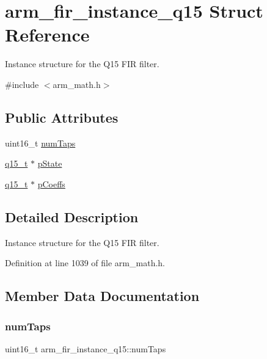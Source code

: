 \hypertarget{structarm__fir__instance__q15}{}\section{arm\+\_\+fir\+\_\+instance\+\_\+q15 Struct Reference}
\label{structarm__fir__instance__q15}


Instance structure for the Q15 F\+IR filter.  




{\ttfamily \#include $<$arm\+\_\+math.\+h$>$}

\subsection*{Public Attributes}
\begin{DoxyCompactItemize}
\item 
uint16\+\_\+t \hyperlink{structarm__fir__instance__q15_a0e46f93cf51bfb18b1be808be9c5bfc9}{num\+Taps}
\item 
\hyperlink{arm__math_8h_ab5a8fb21a5b3b983d5f54f31614052ea}{q15\+\_\+t} $\ast$ \hyperlink{structarm__fir__instance__q15_aa8d25f44f45b6a6c4cf38c31569b8a01}{p\+State}
\item 
\hyperlink{arm__math_8h_ab5a8fb21a5b3b983d5f54f31614052ea}{q15\+\_\+t} $\ast$ \hyperlink{structarm__fir__instance__q15_a6d16db16a5f8f0db54938f2967244d9e}{p\+Coeffs}
\end{DoxyCompactItemize}


\subsection{Detailed Description}
Instance structure for the Q15 F\+IR filter. 

Definition at line 1039 of file arm\+\_\+math.\+h.



\subsection{Member Data Documentation}
\mbox{\label{structarm__fir__instance__q15_a0e46f93cf51bfb18b1be808be9c5bfc9}} 
\subsubsection{\texorpdfstring{num\+Taps}{numTaps}}
{\footnotesize\ttfamily uint16\+\_\+t arm\+\_\+fir\+\_\+instance\+\_\+q15\+::num\+Taps}

